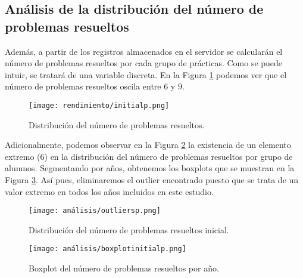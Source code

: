 \subsection{Análisis de la distribución del número de problemas resueltos}\label{sec:NumProblems}

Además, a partir de los registros almacenados en el servidor se calcularán el número de problemas resueltos por cada grupo de prácticas. Como se puede intuir, se tratará de una variable discreta. En la Figura \ref{fig:initialp} podemos ver que el número de problemas resueltos oscila entre $6$ y $9$.

\begin{figure}[H]
    \centering
    \texttt{[image: rendimiento/initialp.png]}
    \caption{Distribución del número de problemas resueltos.}
    \label{fig:initialp}
\end{figure}

Adicionalmente, podemos observar en la Figura \ref{fig:outliersp} la existencia de un elemento extremo ($6$) en la distribución del número de problemas resueltos por grupo de alumnos. Segmentando por años, obtenemos los boxplots que se muestran en la Figura \ref{fig:boxplotproblemsyear}. Así pues, eliminaremos el outlier encontrado puesto que se trata de un valor extremo en todos los años incluidos en este estudio.

\begin{figure}[H]
    \centering
    \texttt{[image: análisis/outliersp.png]}
    \caption{Distribución del número de problemas resueltos inicial.}
    \label{fig:outliersp}
\end{figure}

\begin{figure}[H]
    \centering
    \texttt{[image: análisis/boxplotinitialp.png]}
    \caption{Boxplot del número de problemas resueltos por año.}
    \label{fig:boxplotproblemsyear}
\end{figure}